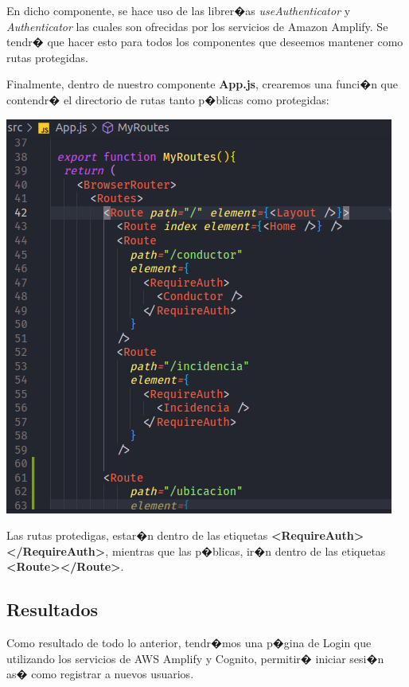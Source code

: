 \documentclass[12pt,letterpaper]{article}
\begin{document}
En dicho componente, se hace uso de las librer�as \emph{useAuthenticator} y \emph{Authenticator} las cuales son ofrecidas por los servicios de Amazon Amplify. Se tendr� que hacer esto para todos los componentes que deseemos mantener como rutas protegidas.


Finalmente, dentro de nuestro componente \textbf{App.js}, crearemos una funci�n que contendr� el directorio de rutas tanto p�blicas como protegidas:

\begin{center}
  \includegraphics[scale=0.5]{imagenes/routesjs}
 \label{fig:routesjs} 
\end{center} 

Las rutas protedigas, estar�n dentro de las etiquetas \textbf{<RequireAuth></RequireAuth>}, mientras que las p�blicas, ir�n dentro de las etiquetas \textbf{<Route></Route>}.


\subsection{Resultados}

Como resultado de todo lo anterior, tendr�mos una p�gina de Login que utilizando los servicios de AWS Amplify y Cognito, permitir� iniciar sesi�n as� como registrar a nuevos usuarios.
\end{document}
